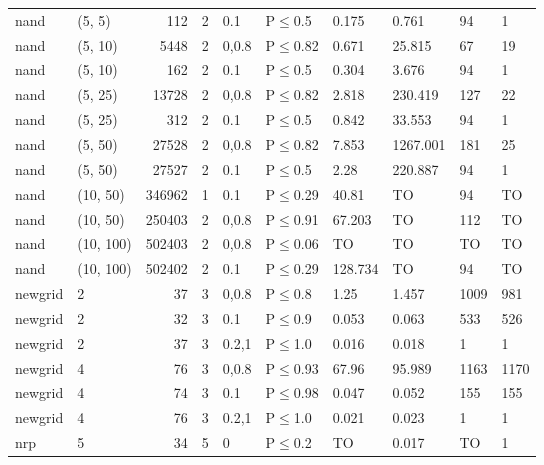 \begin{longtable}{llrrllllll}
 nand          & (5, 5)    &    	112 &   2 & 0.1   & P$\leq$0.5   & 0.175   & 0.761    & 94     & 1      \\
 nand          & (5, 10)   &   	5448 &   2 & 0,0.8 & P$\leq$0.82  & 0.671   & 25.815   & 67     & 19     \\
 nand          & (5, 10)   &    	162 &   2 & 0.1   & P$\leq$0.5   & 0.304   & 3.676    & 94     & 1      \\
 nand          & (5, 25)   &  	13728 &   2 & 0,0.8 & P$\leq$0.82  & 2.818   & 230.419  & 127    & 22     \\
 nand          & (5, 25)   &    	312 &   2 & 0.1   & P$\leq$0.5   & 0.842   & 33.553   & 94     & 1      \\
 nand          & (5, 50)   &  	27528 &   2 & 0,0.8 & P$\leq$0.82  & 7.853   & 1267.001 & 181    & 25     \\
 nand          & (5, 50)   &  	27527 &   2 & 0.1   & P$\leq$0.5   & 2.28    & 220.887  & 94     & 1      \\
 nand          & (10, 50)  & 	346962 &   1 & 0.1   & P$\leq$0.29  & 40.81   & TO       & 94     & TO     \\
 nand          & (10, 50)  & 	250403 &   2 & 0,0.8 & P$\leq$0.91  & 67.203  & TO       & 112    & TO     \\
 nand          & (10, 100) & 	502403 &   2 & 0,0.8 & P$\leq$0.06  & TO      & TO       & TO     & TO     \\
 nand          & (10, 100) & 	502402 &   2 & 0.1   & P$\leq$0.29  & 128.734 & TO       & 94     & TO     \\
 newgrid       & 2         &     	37 &   3 & 0,0.8 & P$\leq$0.8   & 1.25    & 1.457    & 1009   & 981    \\
 newgrid       & 2         &     	32 &   3 & 0.1   & P$\leq$0.9   & 0.053   & 0.063    & 533    & 526    \\
 newgrid       & 2         &     	37 &   3 & 0.2,1 & P$\leq$1.0   & 0.016   & 0.018    & 1      & 1      \\
 newgrid       & 4         &     	76 &   3 & 0,0.8 & P$\leq$0.93  & 67.96   & 95.989   & 1163   & 1170   \\
 newgrid       & 4         &     	74 &   3 & 0.1   & P$\leq$0.98  & 0.047   & 0.052    & 155    & 155    \\
 newgrid       & 4         &     	76 &   3 & 0.2,1 & P$\leq$1.0   & 0.021   & 0.023    & 1      & 1      \\
 nrp           & 5         &     	34 &   5 & 0     & P$\leq$0.2   & TO      & 0.017    & TO     & 1      \\

\end{longtable}
